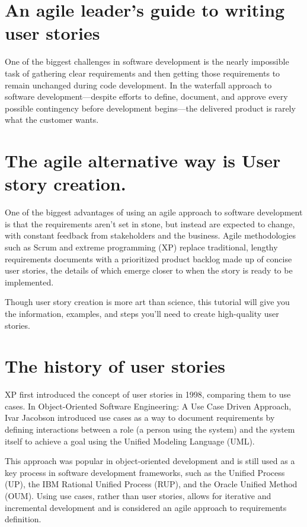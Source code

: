 \section{An agile leader's guide to writing user stories}

 \large{
One of the biggest challenges in software development is the nearly impossible task of gathering clear requirements and then getting those requirements to remain unchanged during code development. In the waterfall approach to software development—despite efforts to define, document, and approve every possible contingency before development begins—the delivered product is rarely what the customer wants.}

\section{The agile alternative way is User story creation.}

\item One of the biggest advantages of using an agile approach to software development is that the requirements aren't set in stone, but instead are expected to change, with constant feedback from stakeholders and the business. Agile methodologies such as Scrum and extreme programming (XP) replace traditional, lengthy requirements documents with a prioritized product backlog made up of concise user stories, the details of which emerge closer to when the story is ready to be implemented.

\item Though user story creation is more art than science, this tutorial will give you the information, examples, and steps you’ll need to create high-quality user stories.

\section{The history of user stories}
\item XP first introduced the concept of user stories in 1998, comparing them to use cases. In Object-Oriented Software Engineering: A Use Case Driven Approach, Ivar Jacobson introduced use cases as a way to document requirements by defining interactions between a role (a person using the system) and the system itself to achieve a goal using the Unified Modeling Language (UML).

\item This approach was popular in object-oriented development and is still used as a key process in software development frameworks, such as the Unified Process (UP), the IBM Rational Unified Process (RUP), and the Oracle Unified Method (OUM). Using use cases, rather than user stories, allows for iterative and incremental development and is considered an agile approach to requirements definition.

